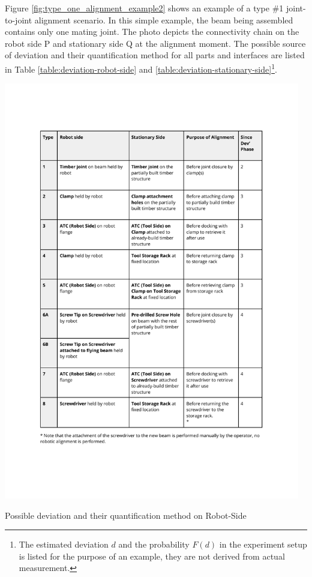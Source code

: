 Figure \ref{fig:type_one_alignment_example2} shows an example of a type \#1 joint-to-joint alignment scenario. In this simple example, the beam being assembled contains only one mating joint. The photo depicts the connectivity chain on the robot side P and stationary side Q at the alignment moment. The possible source of deviation and their quantification method for all parts and interfaces are listed in Table \ref{table:deviation-robot-side} and \ref{table:deviation-stationary-side}\footnote{The estimated deviation $d$ and the probability $F(d)$ in the experiment setup is listed for the purpose of an example, they are not derived from actual measurement.}.

\FloatBarrier

\begin{table}[t]
    \includegraphics[page=3, trim=25.4mm 30mm 25.4mm 33mm, clip, width=0.97\textwidth]{tables/Tables in Chapter 9 to 11.pdf}
    \caption{Possible deviation and their quantification method on Robot-Side}
    \label{table:deviation-robot-side}
\end{table}

